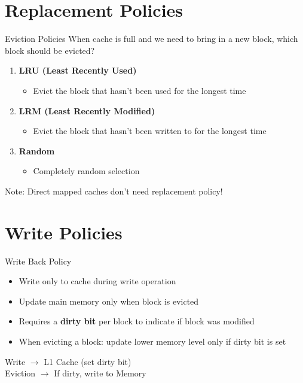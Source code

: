 \documentclass[aspectratio=169,12pt]{beamer}
\begin{document}
\section{Replacement Policies}
\begin{frame}{Eviction Policies}
When cache is full and we need to bring in a new block, which block should be evicted?

\begin{enumerate}
    \item \textbf{LRU (Least Recently Used)}
    \begin{itemize}
        \item Evict the block that hasn't been used for the longest time
    \end{itemize}
    
    \item \textbf{LRM (Least Recently Modified)}
    \begin{itemize}
        \item Evict the block that hasn't been written to for the longest time
    \end{itemize}
    
    \item \textbf{Random}
    \begin{itemize}
        \item Completely random selection
    \end{itemize}
\end{enumerate}

Note: Direct mapped caches don't need replacement policy!
\end{frame}

\section{Write Policies}
\begin{frame}{Write Back Policy}
\begin{itemize}
    \item Write only to cache during write operation
    \item Update main memory only when block is evicted
    \item Requires a \textbf{dirty bit} per block to indicate if block was modified
    \item When evicting a block: update lower memory level only if dirty bit is set
\end{itemize}

\begin{center}
\begin{tcolorbox}[colback=blue!10, width=0.7\textwidth]
Write $\rightarrow$ L1 Cache (set dirty bit)\\
Eviction $\rightarrow$ If dirty, write to Memory
\end{tcolorbox}
\end{center}
\end{frame}
\end{document}
